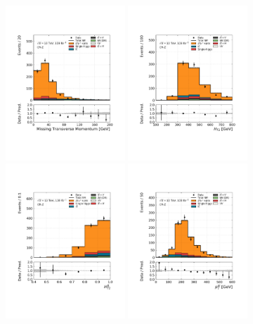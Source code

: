 \begin{figure}[!htb]
    \centering
    \includegraphics[width=0.4\textwidth]{figures/search_hh/bkg_estimate/crvr/crzhf/crztest_met}
    \includegraphics[width=0.4\textwidth]{figures/search_hh/bkg_estimate/crvr/crzhf/crztest_HT2}
    \includegraphics[width=0.4\textwidth]{figures/search_hh/bkg_estimate/crvr/crzhf/crztest_HT2Ratio}
    \includegraphics[width=0.4\textwidth]{figures/search_hh/bkg_estimate/crvr/crzhf/crztest_pTll}

\end{figure}
